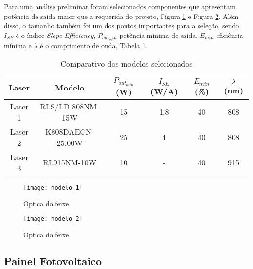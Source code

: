 Para uma análise preliminar foram selecionados componentes que apresentam potência de saída maior que a requerida do projeto, Figura \ref{fig:modelo_1} e Figura \ref{fig:modelo_2}. Além disso, o tamanho também foi um dos pontos importantes para a seleção, sendo $I_{SE}$ é o índice \emph{Slope Efficiency}, \mbox{$P_{out_min}$} potência mínima de saída, \mbox{$E_{min}$} eficiência mínima e \mbox{$\lambda$} é o comprimento de onda, Tabela \ref{tab:comp_modelo}.

\begin{table}[ht!]
	\caption{Comparativo dos modelos selecionados}
	\label{tab:comp_modelo}
	\begin{tabular}{c|c|c|c|c|c}
		\hline
		\textbf{Laser} & \textbf{Modelo} & \textbf{\mbox{$P_{out_{min}}$} (W)} & \textbf{\mbox{$I_{SE}$} (W/A)} & \textbf{\mbox{$E_{min}$} (\%)} & \textbf{\mbox{$\lambda$} (nm)}\\
		\hline
		Laser 1 & RLS/LD-808NM-15W & 15 & 1,8 & 40 & 808\\
		\hline
		Laser 2 & K808DAECN-25.00W & 25 & 4 & 40 & 808\\
		\hline
		Laser 3 & RL915NM-10W & 10 & - & 40 & 915\\
		\hline
	\end{tabular}
\end{table}

\begin{figure}[ht!]
\centering
\caption{Optica do feixe}
\label{fig:modelo_1}
\texttt{[image: modelo\_1]}
\end{figure}

\begin{figure}[ht!]
\centering
\caption{Optica do feixe}
\label{fig:modelo_2}
\texttt{[image: modelo\_2]}
\end{figure}

\subsection{Painel Fotovoltaico}

